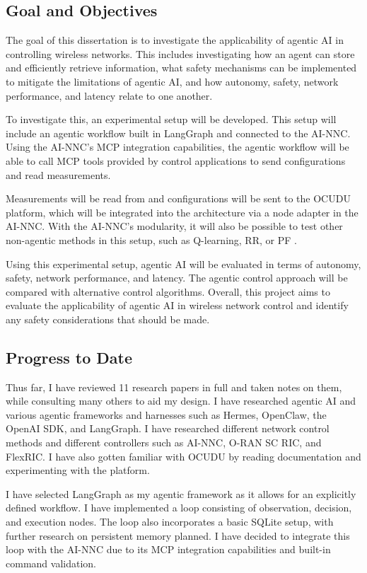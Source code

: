 \documentclass[12pt,a4paper]{article}
\begin{document}
\subsection{Goal and Objectives}
The goal of this dissertation is to investigate the applicability of agentic AI in controlling wireless networks. This includes investigating how an agent can store and efficiently retrieve information, what safety mechanisms can be implemented to mitigate the limitations of agentic AI, and how autonomy, safety, network performance, and latency relate to one another.

To investigate this, an experimental setup will be developed. This setup will include an agentic workflow built in LangGraph and connected to the AI-NNC. Using the AI-NNC's MCP integration capabilities, the agentic workflow will be able to call MCP tools provided by control applications to send configurations and read measurements. 

Measurements will be read from and configurations will be sent to the OCUDU platform, which will be integrated into the architecture via a node adapter in the AI-NNC. With the AI-NNC's modularity, it will also be possible to test other non-agentic methods in this setup, such as Q-learning, RR, or PF \cite{mamane2022scheduling}.

Using this experimental setup, agentic AI will be evaluated in terms of autonomy, safety, network performance, and latency. The agentic control approach will be compared with alternative control algorithms. Overall, this project aims to evaluate the applicability of agentic AI in wireless network control and identify any safety considerations that should be made.

\subsection{Progress to Date}
Thus far, I have reviewed 11 research papers in full and taken notes on them, while consulting many others to aid my design. I have researched agentic AI and various agentic frameworks and harnesses such as Hermes, OpenClaw, the OpenAI SDK, and LangGraph. I have researched different network control methods and different controllers such as AI-NNC, O-RAN SC RIC, and FlexRIC. I have also gotten familiar with OCUDU by reading documentation and experimenting with the platform.

I have selected LangGraph as my agentic framework as it allows for an explicitly defined workflow. I have implemented a loop consisting of observation, decision, and execution nodes. The loop also incorporates a basic SQLite setup, with further research on persistent memory planned. I have decided to integrate this loop with the AI-NNC due to its MCP integration capabilities and built-in command validation. 
\end{document}
